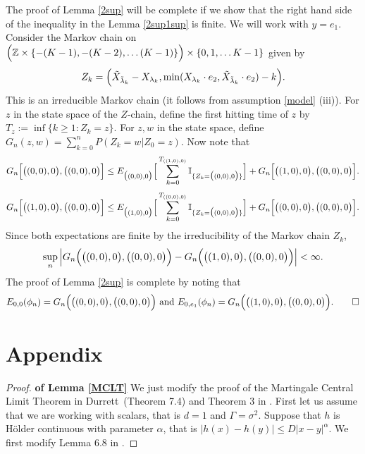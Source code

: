 \documentclass[11pt]{amsart}
\begin{document}
 The proof of Lemma \ref{2sup} will be complete if we show that the right hand side of the inequality in the Lemma \ref{2sup1sup} is finite. We will work with $y=e_1$. Consider the Markov chain on  $\Big{(}\mathbb{Z} \times \{ -(K-1),-(K-2), \dots (K-1) \} \Big) \times \{0,1,\dots K-1\} $ given by 
 \[ Z_k = \Big{(}\tilde{X}_{\tilde{\lambda}_k}-X_{\lambda_k}, \min(X_{\lambda_k} \cdot e_2, \tilde{X}_{\tilde{\lambda}_k}\cdot e_2) -k \Big{)}. \]
This is an irreducible Markov chain (it follows from assumption \ref{model} (iii)). For $z$ in the state space of the $Z$-chain, define the first hitting time of $z$ by $T_z := \inf\{k \ge 1: Z_k =z \}$. For $z,w$ in the state space, define \begin{math} G_n(z,w)=\sum_{k=0}^n P(Z_k=w \vert Z_0=z) \end{math}. Now note that
\[ G_n\Big{[} \big{(}(0,0),0\big{)},\big{(}(0,0),0\big{)}\Big{ ]} \leq E_{\big{(}(0,0),0\big{)}} \Big{[}\sum_{k=0}^{T_{((1,0),0)}} \mathbb{I}_{\lbrace Z_k =  \big{(}(0,0),0\big{)}\rbrace} \Big{]} + G_n\Big{[}\big{(}(1,0),0 \big{)},\big{(}(0,0),0\big{)} \Big{]}.\]
\[ G_n\Big{[} \big{(}(1,0),0\big{)},\big{(}(0,0),0\big{)}\Big{ ]} \leq E_{\big{(}(1,0),0\big{)}} \Big{[}\sum_{k=0}^{T_{((0,0),0)}}\mathbb{I}_{\lbrace Z_k =  \big{(}(0,0),0\big{)}\rbrace} \Big{]} + G_n\Big{[}\big{(}(0,0),0\big{)},\big{(}(0,0),0\big{)} \Big{]} .\]
Since both expectations are finite by the irreducibility of the Markov chain $Z_k$,
\[ \sup_n \Big{\vert}G_n\Big{(} \big{(}(0,0),0\big{)},\big{(}(0,0),0\big{)} \Big{)}-G_n\Big{(} \big{(}(1,0),0\big{)},\big{(}(0,0),0\big{)} \Big{)}\Big{\vert} < \infty. \]
The proof of Lemma \ref{2sup} is complete by noting that 
\[E_{0,0}(\phi_n)= G_n\Big{(} \big{(}(0,0),0\big{)},\big{(}(0,0),0\big{)} \Big{)} \mbox{ and }E_{0,e_1}(\phi_n)= G_n\Big{(} \big{(}(1,0),0\big{)},\big{(}(0,0),0\big{)} \Big{)}.\qed \]

\bigskip

\section{Appendix}
\begin{proof} \textbf{of Lemma \ref{MCLT}} We just modify the proof of the Martingale Central Limit Theorem in Durrett~\cite{durr}(Theorem 7.4) and Theorem 3 in \cite{rsptrf}. First let us assume that we are working with scalars, that is $ d=1$ and $\Gamma = \sigma^2$. Suppose that $h$ is H\"older continuous with parameter $\alpha$, that is $\vert h(x)-h(y) \vert  \leq D\vert x- y \vert ^{\alpha}$. We first modify Lemma 6.8 in \cite{durr}.
\end{proof}
\end{document}
